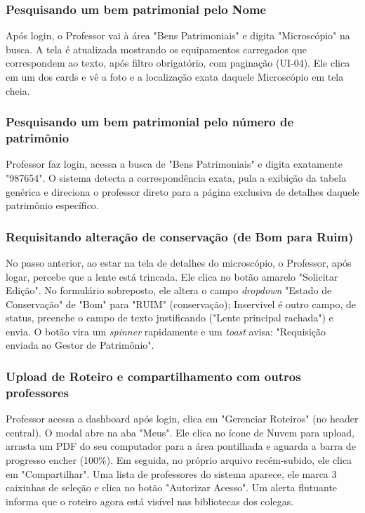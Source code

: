 \subsubsection{Pesquisando um bem patrimonial pelo Nome}
Após login, o Professor vai à área "Bens Patrimoniais" e digita "Microscópio" na busca. A tela é atualizada mostrando os equipamentos carregados que correspondem ao texto, após filtro obrigatório, com paginação (UI-04). Ele clica em um dos cards e vê a foto e a localização exata daquele Microscópio em tela cheia.

\subsubsection{Pesquisando um bem patrimonial pelo número de patrimônio}
Professor faz login, acessa a busca de "Bens Patrimoniais" e digita exatamente "987654". O sistema detecta a correspondência exata, pula a exibição da tabela genérica e direciona o professor direto para a página exclusiva de detalhes daquele patrimônio específico.

\subsubsection{Requisitando alteração de conservação (de Bom para Ruim)}
No passo anterior, ao estar na tela de detalhes do microscópio, o Professor, após logar, percebe que a lente está trincada. Ele clica no botão amarelo "Solicitar Edição". No formulário sobreposto, ele altera o campo \textit{dropdown} "Estado de Conservação" de "Bom" para "RUIM" (conservação); Inservivel é outro campo, de status, preenche o campo de texto justificando ("Lente principal rachada") e envia. O botão vira um \textit{spinner} rapidamente e um \textit{toast} avisa: "Requisição enviada ao Gestor de Patrimônio".

\subsubsection{Upload de Roteiro e compartilhamento com outros professores}
Professor acessa a dashboard após login, clica em "Gerenciar Roteiros" (no header central). O modal abre na aba "Meus". Ele clica no ícone de Nuvem para upload, arrasta um PDF do seu computador para a área pontilhada e aguarda a barra de progresso encher (100\%). Em seguida, no próprio arquivo recém-subido, ele clica em "Compartilhar". Uma lista de professores do sistema aparece, ele marca 3 caixinhas de seleção e clica no botão "Autorizar Acesso". Um alerta flutuante informa que o roteiro agora está visível nas bibliotecas dos colegas.

